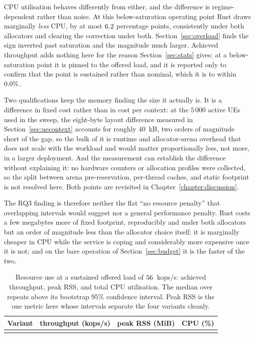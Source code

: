\documentclass[english,twoside,openright,a4paper,censored,csm,software-track-2020]{HYthesisML}
\begin{document}
CPU utilisation behaves differently from either, and the difference is regime-dependent rather
than noise. At this below-saturation operating point Rust draws marginally \emph{less} CPU, by at
most $6.2$ percentage points, consistently under both allocators and clearing the
correction under both. Section~\ref{sec:overload} finds the sign inverted past saturation and the
magnitude much larger. Achieved throughput adds nothing here for the reason
Section~\ref{sec:stats} gives: at a below-saturation point it is pinned to the offered load, and
it is reported only to confirm that the point is sustained rather than nominal, which it is to
within $0.0\%$.

Two qualifications keep the memory finding the size it actually is. It is a difference in fixed
cost rather than in cost per context: at the $5\,000$ active UEs used in the sweep, the
eight-byte layout difference measured in Section~\ref{sec:uecontext} accounts for roughly
$40$~kB, two orders of magnitude short of the gap, so the bulk of it is runtime and
allocator-arena overhead that does not scale with the workload and would matter proportionally
less, not more, in a larger deployment. And the measurement can establish the difference
without explaining it: no hardware counters or allocation profiles were collected, so the split
between arena pre-reservation, per-thread caches, and static footprint is not resolved here.
Both points are revisited in Chapter~\ref{chapter:discussion}.

The RQ3 finding is therefore neither the flat ``no resource penalty'' that overlapping intervals
would suggest nor a general performance penalty. Rust costs a few megabytes more of fixed
footprint, reproducibly and under both allocators but an order of magnitude less than the allocator
choice itself; it is marginally cheaper in CPU while the service is coping and considerably more
expensive once it is not; and on the bare operation of Section~\ref{sec:budget} it is the faster of
the two.

\begin{table}
\centering
\small
\caption[Resource use at the representative load]{Resource use at a sustained offered load of $56$~kops/s: achieved throughput,
peak RSS, and total CPU utilisation. The median over \NRepeats{} repeats above its bootstrap
$95\%$ confidence interval. Peak RSS is the one metric here whose intervals separate the four
variants cleanly.\label{tab:resource}}
\begin{tabular}{@{}l r r r@{}}
\hline\hline
Variant & throughput (kops/s) & peak RSS (MiB) & CPU (\%) \\
\hline
\\
\hline
\end{tabular}
\end{table}
\end{document}
